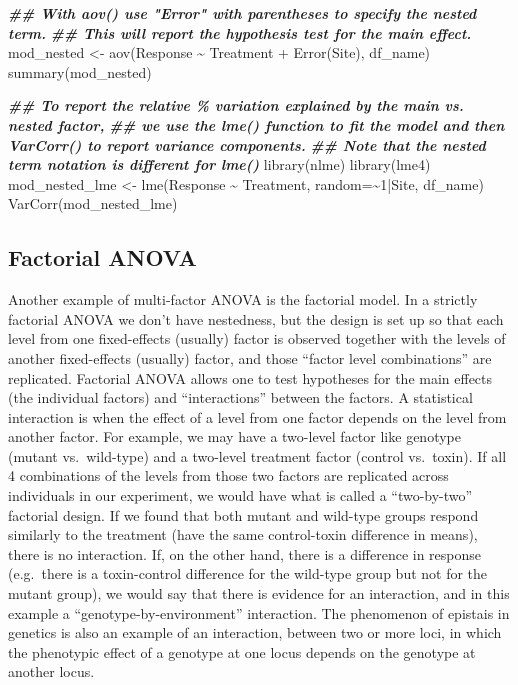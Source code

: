 \documentclass[
]{book}
\newenvironment{Shaded}{\begin{snugshade}}{\end{snugshade}}
\newcommand{\AttributeTok}[1]{\textcolor[rgb]{0.77,0.63,0.00}{#1}}
\newcommand{\DecValTok}[1]{\textcolor[rgb]{0.00,0.00,0.81}{#1}}
\newcommand{\DocumentationTok}[1]{\textcolor[rgb]{0.56,0.35,0.01}{\textbf{\textit{#1}}}}
\newcommand{\FunctionTok}[1]{\textcolor[rgb]{0.00,0.00,0.00}{#1}}
\newcommand{\NormalTok}[1]{#1}
\newcommand{\OtherTok}[1]{\textcolor[rgb]{0.56,0.35,0.01}{#1}}
\newcommand{\SpecialCharTok}[1]{\textcolor[rgb]{0.00,0.00,0.00}{#1}}
\begin{document}
\begin{Shaded}
\begin{Highlighting}[]
\DocumentationTok{\#\# With aov() use "Error" with parentheses to specify the nested term.}
\DocumentationTok{\#\# This will report the hypothesis test for the main effect.}
\NormalTok{mod\_nested }\OtherTok{\textless{}{-}} \FunctionTok{aov}\NormalTok{(Response }\SpecialCharTok{\textasciitilde{}}\NormalTok{ Treatment }\SpecialCharTok{+} \FunctionTok{Error}\NormalTok{(Site), df\_name)}
\FunctionTok{summary}\NormalTok{(mod\_nested)}

\DocumentationTok{\#\# To report the relative \% variation explained by the main vs. nested factor,}
\DocumentationTok{\#\# we use the lme() function to fit the model and then VarCorr() to report variance components.}
\DocumentationTok{\#\# Note that the nested term notation is different for lme()}
\FunctionTok{library}\NormalTok{(nlme)}
\FunctionTok{library}\NormalTok{(lme4)}
\NormalTok{mod\_nested\_lme }\OtherTok{\textless{}{-}} \FunctionTok{lme}\NormalTok{(Response }\SpecialCharTok{\textasciitilde{}}\NormalTok{ Treatment, }\AttributeTok{random=}\SpecialCharTok{\textasciitilde{}}\DecValTok{1}\SpecialCharTok{|}\NormalTok{Site, df\_name)}
\FunctionTok{VarCorr}\NormalTok{(mod\_nested\_lme)}
\end{Highlighting}
\end{Shaded}

\hypertarget{factorial-anova}{%
\subsection{Factorial ANOVA}\label{factorial-anova}}

Another example of multi-factor ANOVA is the factorial model. In a strictly factorial ANOVA we don't have nestedness, but the design is set up so that each level from one fixed-effects (usually) factor is observed together with the levels of another fixed-effects (usually) factor, and those ``factor level combinations'' are replicated. Factorial ANOVA allows one to test hypotheses for the main effects (the individual factors) and ``interactions'' between the factors. A statistical interaction is when the effect of a level from one factor depends on the level from another factor. For example, we may have a two-level factor like genotype (mutant vs.~wild-type) and a two-level treatment factor (control vs.~toxin). If all 4 combinations of the levels from those two factors are replicated across individuals in our experiment, we would have what is called a ``two-by-two'' factorial design. If we found that both mutant and wild-type groups respond similarly to the treatment (have the same control-toxin difference in means), there is no interaction. If, on the other hand, there is a difference in response (e.g.~there is a toxin-control difference for the wild-type group but not for the mutant group), we would say that there is evidence for an interaction, and in this example a ``genotype-by-environment'' interaction. The phenomenon of epistais in genetics is also an example of an interaction, between two or more loci, in which the phenotypic effect of a genotype at one locus depends on the genotype at another locus.
\end{document}
